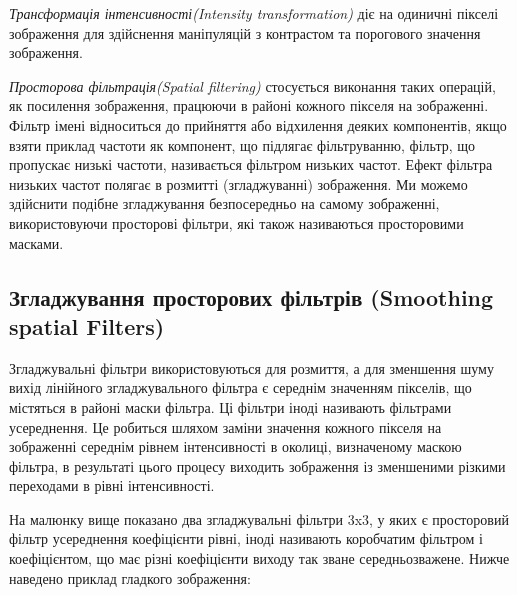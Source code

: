\documentclass{article}
\begin{document}
    \emph{Трансформація інтенсивності(Intensity transformation)} діє на одиничні пікселі зображення для здійснення маніпуляцій з контрастом та порогового значення зображення.

    \emph{Просторова фільтрація(Spatial filtering)} стосується виконання таких операцій, як посилення зображення, працюючи в районі кожного пікселя на зображенні.
    Фільтр імені відноситься до прийняття або відхилення деяких компонентів, якщо взяти приклад частоти як компонент, що підлягає фільтруванню, фільтр, що пропускає низькі частоти, називається фільтром низьких частот.
    Ефект фільтра низьких частот полягає в розмитті (згладжуванні) зображення.
    Ми можемо здійснити подібне згладжування безпосередньо на самому зображенні, використовуючи просторові фільтри, які також називаються просторовими масками.

    \subsection{Згладжування просторових фільтрів (Smoothing spatial Filters)}\label{subsec:spatial_smoothing_filters}
    Згладжувальні фільтри використовуються для розмиття, а для зменшення шуму вихід лінійного згладжувального фільтра є середнім значенням пікселів, що містяться в районі маски фільтра.
    Ці фільтри іноді називають фільтрами усереднення.
    Це робиться шляхом заміни значення кожного пікселя на зображенні середнім рівнем інтенсивності в околиці, визначеному маскою фільтра, в результаті цього процесу виходить зображення із зменшеними різкими переходами в рівні інтенсивності.

    На малюнку вище показано два згладжувальні фільтри 3x3, у яких є просторовий фільтр усереднення
    коефіцієнти рівні, іноді називають коробчатим фільтром і коефіцієнтом, що має різні коефіцієнти виходу
    так зване середньозважене.
    Нижче наведено приклад гладкого зображення:
\end{document}
